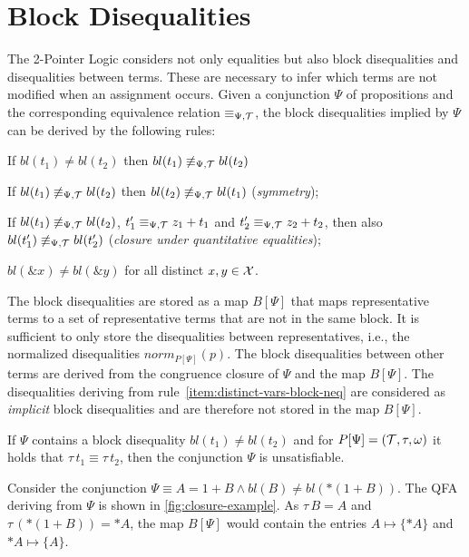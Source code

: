 \section{Block Disequalities}\label{section:block-disequalities}

The 2-Pointer Logic considers not only equalities but also block disequalities and disequalities between terms.
These are necessary to infer which terms are not
modified when an assignment occurs.
Given a conjunction $\Psi$ of propositions and the corresponding equivalence relation $\equiv_{\Psi,\mathcal{T}}$, the block disequalities implied by $\Psi$ can be derived by the following rules:

\begin{enumerate}[label={[B\arabic*]}, ref={[B\arabic*]}]
    \setcounter{enumi}{-1} %
    \item If $bl(t_1)\neq bl(t_2)$ then $bl(t_1)\not\equiv_{\Psi,\mathcal{T}} bl(t_2)$
    \item If $bl(t_1)\not\equiv_{\Psi,\mathcal{T}} bl(t_2)$ then $bl(t_2)\not\equiv_{\Psi,\mathcal{T}} bl(t_1)$
          (\emph{symmetry});
          \item\label{item:closure-under-quantitative-equalities}
          If $bl(t_1)\not\equiv_{\Psi,\mathcal{T}} bl(t_2)$, $t'_1 \equiv_{\Psi,\mathcal{T}} z_1+t_1$ and $t'_2\equiv_{\Psi,\mathcal{T}} z_2+t_2$, then
          also $bl(t'_1)\not\equiv_{\Psi,\mathcal{T}} bl(t'_2)$ (\emph{closure under quantitative equalities});
          \item\label{item:distinct-vars-block-neq} $bl(\&x) \neq bl(\&y)$ for all distinct $x, y \in \mathcal{X}$.
\end{enumerate}

The block disequalities are stored as a map $B[\Psi]$ that maps representative terms to a set of representative terms that are not in the same block.
It is sufficient to only store the disequalities between representatives, i.e.,
the normalized disequalities $norm_{P[\Psi]}(p)$.
The block disequalities between other terms are derived from the congruence closure of $\Psi$ and the map $B[\Psi]$.
The disequalities deriving from rule~\ref{item:distinct-vars-block-neq} are considered as \emph{implicit} block disequalities and are therefore not stored in the map $B[\Psi]$.

If $\Psi$ contains a block disequality $bl(t_1) \neq bl(t_2)$ and for $P[\Psi] = (\mathcal{T}, \tau, \omega)$ it holds that
$\tau\,t_1 \equiv \tau\,t_2$, then the conjunction $\Psi$ is unsatisfiable.

\begin{example}
    Consider the conjunction $\Psi \equiv A = 1 + B \land bl(B) \neq bl(*(1 + B))$.
    The QFA deriving from $\Psi$ is shown in \cref{fig:closure-example}.
    As $\tau\,B = A$ and $\tau\,(*(1+B)) = *A$, the map $B[\Psi]$ would contain the entries $A \mapsto \{*A\}$ and $*A \mapsto \{A\}$.
\end{example}


